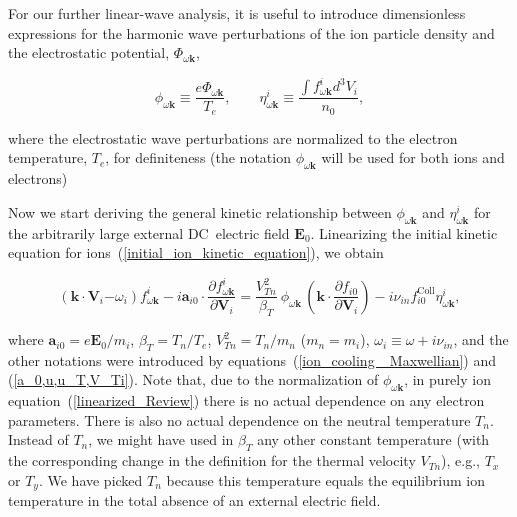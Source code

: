 \documentclass[draft]{agujournal2019}
\renewcommand{\vec}{\mathbf}
\begin{document}
For our further linear-wave analysis, it is useful to introduce 
dimensionless expressions for the harmonic wave perturbations of the ion
particle density %
and the electrostatic potential, $\Phi_{\omega\vec{k}}$,
\begin{linenomath*}
\begin{equation}
\phi_{\omega\vec{k}}\equiv\frac{e\Phi_{\omega\vec{k}}}{T_{e}},\qquad
\eta_{\omega\vec{k}}^{i}\equiv\frac{\int f_{\omega\vec{k}}^{i}d^{3}V_{i}%
}{n_{0}},\label{phi,etc_Review}%
\end{equation}
\end{linenomath*}
where the electrostatic wave perturbations are normalized to the electron
temperature, $T_{e}$, for definiteness (the notation $\phi_{\omega\vec{k}}$
will be used for both ions and electrons) 

Now we start deriving the general kinetic relationship between $\phi
_{\omega\vec{k}}$ and $\eta_{\omega\vec{k}}^{i}$ for the arbitrarily large
external DC\ electric field $\vec{E}_{0}$. Linearizing the initial kinetic
equation for ions~(\ref{initial_ion_kinetic_equation}), we obtain
\begin{linenomath*}
\begin{equation}
(\vec{k}\cdot\vec{V}_{i}\mathbf{-}\omega_{i})f_{\omega\vec{k}}^{i}-i\vec{a}%
_{i0}\cdot\frac{\partial f_{\omega\vec{k}}^{i}}{\partial\vec{V}_{i}}%
=\frac{V_{Tn}^{2}}{\beta_{T}}\ \phi_{\omega\vec{k}}\,\left(  \vec{k}\cdot
\frac{\partial f_{i0}}{\partial\vec{V}_{i}}\right)  -i\nu_{in}f_{i0}%
^{\mathrm{Coll}}\eta_{\omega\vec{k}}^{i},\label{linearized_Review}%
\end{equation}
\end{linenomath*}
where $\vec{a}_{i0}=e\vec{E}_{0}/m_{i}$, $\beta_{T}=T_{n}/T_{e}$, 
$V_{Tn}^{2}=T_{n}/m_{n}$ ($m_{n}=m_{i}$), $\omega_{i}\equiv\omega+i\nu_{in}$, and the other
notations were introduced by equations~(\ref{ion_cooling _Maxwellian}) and
(\ref{a_0,u,u_T,V_Ti}). Note that, due to the normalization of $\phi
_{\omega\vec{k}}$, in purely ion equation~(\ref{linearized_Review}) there 
is no actual dependence on any electron parameters. There is also no actual
dependence on the neutral temperature $T_{n}$. Instead of $T_{n}$, we might
have used in $\beta_{T}$ any other constant temperature (with the
corresponding change in the definition for the thermal velocity $V_{Tn}$),
e.g., $T_{x}$ or $T_{y}$. We have picked $T_{n}$ because this
temperature equals the equilibrium ion temperature in the total absence of an
external electric field.
\end{document}
